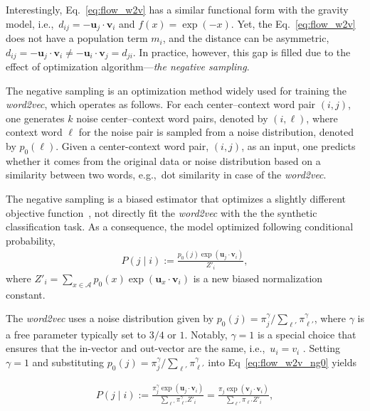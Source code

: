 \documentclass[12pt]{article} %
\def\given{\mid}
\def\eg{e.g.,~}
\def\ie{i.e.,~}
\begin{document}
Interestingly, Eq.~\ref{eq:flow_w2v} has a similar functional form with the gravity model, \ie $d_{ij} = - \bm{u}_{j} \cdot \bm{v}_{i}$ and $f(x) = \exp(-x)$.
Yet, the Eq.~\ref{eq:flow_w2v}  does not have a population term $m_i$, and the distance can be asymmetric,$d_{ij}=- \bm{u}_{j} \cdot \bm{v}_{i} \neq - \bm{u}_{i} \cdot \bm{v}_{j}=d_{ji}$.
In practice, however, this gap is filled due to the effect of optimization algorithm---\emph{the negative sampling}.

The negative sampling is an optimization method widely used for training the \textit{word2vec}, which operates as follows.
For each center--context word pair $(i,j)$, one generates $k$ noise center--context word pairs, denoted by $(i, \ell)$, where context word $\ell$ for the noise pair is sampled from a noise distribution, denoted by $p_{0}(\ell)$.
Given a center-context word pair, $(i,j)$, as an input, one predicts whether it comes from the original data or noise distribution based on
a similarity between two words, \eg dot similarity in case of the \textit{word2vec}.

The negative sampling is a biased estimator that optimizes a slightly different objective function~\autocite{Gutmann2010}, not directly fit the \textit{word2vec} with the the synthetic classification task.
As a consequence, the model optimized following conditional probability,
\begin{align}
    P\left(j \given i \right):= \frac{p_0(j)\exp(\bm{u}_j \cdot \bm{v}_{i})}{Z'_i}, \label{eq:prob_w2v_ng0}
\end{align}
where $Z'_i=\sum_{x \in \mathcal{A}} p_0(x) \exp(\bm{u}_{x} \cdot \bm{v}_{i})$ is a new biased normalization constant.

The \textit{word2vec} uses a noise distribution given by $p_{0}(j) = \pi^{\gamma} _j / \sum_{\ell'} \pi^{\gamma}_{\ell'}$, where $\gamma$ is a free parameter typically set to $3/4$ or $1$. Notably, $\gamma=1$ is a special choice that ensures that the in-vector and out-vector are the same, \ie $u_i = v_i$ \autocite{levy2014neural}. Setting $\gamma = 1$ and substituting $p_{0}(j) = \pi^{\gamma} _j / \sum_{\ell'} \pi^{\gamma}_{\ell'}$ into Eq~\eqref{eq:flow_w2v_ng0} yields

\begin{align}
    P\left(j \given i \right):= \frac{\pi^{\gamma} _j  \exp(\bm{u}_j \cdot \bm{v}_{i})}{ \sum_{\ell'} \pi^{\gamma}_{\ell'} Z'_i} =  \frac{\pi _j  \exp(\bm{v}_j \cdot \bm{v}_{i})}{ \sum_{\ell'} \pi_{\ell'} Z'_i},
\end{align}
\end{document}
